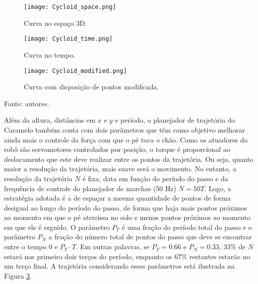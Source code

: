 \documentclass[../main.tex]{subfiles}
\begin{document}
\begin{figure*}[h]
  \centering
  \caption{Trajetórias cicloidais para o passo de robô.}
  \begin{subfigure}[t]{0.32\textwidth}
    \centering
    \texttt{[image: Cycloid\_space.png]}
    \caption{Curva no espaço 3D.}
    \label{fig:traj_space}
  \end{subfigure}
  \begin{subfigure}[t]{0.32\textwidth}
    \centering
    \texttt{[image: Cycloid\_time.png]}
    \caption{Curva no tempo.}
    \label{fig:traj_time}
  \end{subfigure}
  \begin{subfigure}[t]{0.32\textwidth}
    \centering
    \texttt{[image: Cycloid\_modified.png]}
    \caption{Curva com disposição de pontos modificada.}
    \label{fig:traj_time_modified}
  \end{subfigure}
  \vfill
  Fonte: autores.
  \label{fig:traj_curve}
\end{figure*}

Além da altura, distâncias em $x$ e $y$ e período, o planejador de trajetória do Caramelo também conta com dois parâmetros que têm como objetivo melhorar ainda mais o controle da força com que o pé toca o chão. Como os atuadores do robô são servomotores controlados por posição, o torque é proporcional ao deslocamento que este deve realizar entre os pontos da trajetória. Ou seja, quanto maior a resolução da trajetória, mais suave será o movimento. No entanto, a resolução da trajetória $N$ é fixa, data em função do período do passo e da frequência de controle do planejador de marchas (50 Hz) $N = 50T$. Logo, a estratégia adotada é a de espaçar a mesma quantidade de pontos de forma desigual ao longo do período do passo, de forma que haja mais pontos próximos ao momento em que o pé aterrissa no solo e menos pontos próximos ao momento em que ele é erguido. O parâmetro $P_T$ é uma fração do período total do passo e o parâmetro $P_N$ a fração do número total de pontos do passo que deve se encontrar entre o tempo $0$ e $P_T \cdot T$. Em outras palavras, se $P_T = 0.66$ e $P_N = 0.33$, $33\%$ de $N$ estará nos primeiro dois terços do período, enquanto os $67\%$ restantes estarão no um terço final. A trajetória considerando esses parâmetros está ilustrada na Figura \ref{fig:traj_time_modified}.


\begin{figure}

\end{figure}
\end{document}
